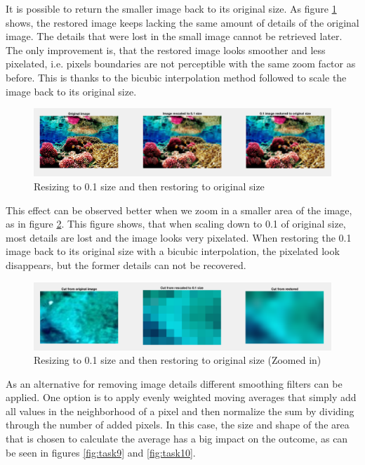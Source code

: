 It is possible to return the smaller image back to its original size. As figure \ref{fig:task7} shows, the restored image keeps lacking the same amount of details of the original image. The details that were lost in the small image cannot be retrieved later. The only improvement is, that the restored image looks smoother and less pixelated, i.e. pixels boundaries are not perceptible with the same zoom factor as before. This is thanks to the bicubic interpolation method followed to scale the image back to its original size.

\begin{figure}[!hbt]
  \includegraphics[width=\textwidth]{./img/task7.png}
  \caption{Resizing to 0.1 size and then restoring to original size}
  \label{fig:task7}
\end{figure}

This effect can be observed better when we zoom in a smaller area of the image, as in figure \ref{fig:task8}. This figure shows, that when scaling down to 0.1 of original size, most details are lost and the image looks very pixelated. When restoring the 0.1 image back to its original size with a bicubic interpolation, the pixelated look disappears, but the former details can not be recovered.

\begin{figure}[!hbt]
  \includegraphics[width=\textwidth]{./img/task8.png}
  \caption{Resizing to 0.1 size and then restoring to original size (Zoomed in)}
  \label{fig:task8}
\end{figure}

As an alternative for removing image details different smoothing filters can be applied. One option is to apply evenly weighted moving averages that simply add all values in the neighborhood of a pixel and then normalize the sum by dividing through the number of added pixels. In this case, the size and shape of the area that is chosen to calculate the average has a big impact on the outcome, as can be seen in figures \ref{fig:task9} and \ref{fig:task10}.

